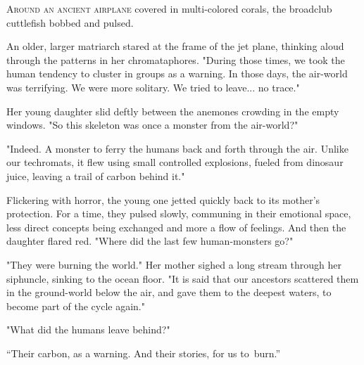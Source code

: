 
\lettrine{A}{round an ancient airplane} covered in multi-colored corals, the
broadclub cuttlefish bobbed and pulsed.

An older, larger matriarch stared at the frame of the jet plane,
thinking aloud through the patterns in her chromataphores. "During those
times, we took the human tendency to cluster in groups as a warning. In
those days, the air-world was terrifying. We were more solitary. We
tried to leave... no trace."

Her young daughter slid deftly between the anemones crowding in the
empty windows. "So this skeleton was once a monster from the air-world?"

"Indeed. A monster to ferry the humans back and forth through the air.
Unlike our techromats, it flew using small controlled explosions, fueled
from dinosaur juice, leaving a trail of carbon behind it."

Flickering with horror, the young one jetted quickly back to its
mother's protection. For a time, they pulsed slowly, communing in their
emotional space, less direct concepts being exchanged and more a flow of
feelings. And then the daughter flared red. "Where did the last few
human-monsters go?"

"They were burning the world." Her mother sighed a long stream through
her siphuncle, sinking to the ocean floor. "It is said that our
ancestors scattered them in the ground-world below the air, and gave
them to the deepest waters, to become part of the cycle again."

"What did the humans leave behind?"

``Their carbon, as a warning. And their stories, for us \mbox{to burn.''}
